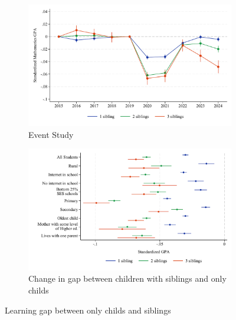 \begin{figure}[htbp]
    \centering
    
    \begin{subfigure}{\textwidth}
        \centering
        \includegraphics[width=\textwidth]{./FIGURES/Event Study/covid_event_bysibs_all_all_std_gpa_m_adj_Tsiblings_Soldest_4.pdf}
        \caption{Event Study}
        \label{fig:main_result_event}
    \end{subfigure}
    
    \vspace{1em} %
    
    \begin{subfigure}{\textwidth}
        \centering
        \includegraphics[width=\textwidth]{./FIGURES/TWFE/covid_twfe_summ_bysibs_all_20-21_gpa_m_adj_Tsiblings_Soldest_4.pdf}
        \caption{Change in gap between children with siblings and only childs}
        \label{fig:main_result_twfe}
    \end{subfigure}
    
    \caption{Learning gap between only childs and siblings}
    \label{fig:main_result}
\end{figure}


\clearpage









\clearpage







